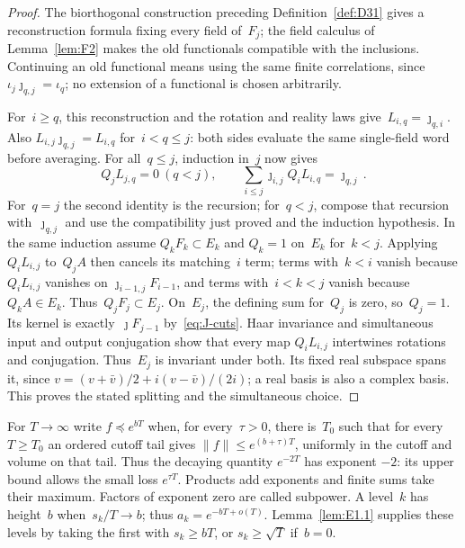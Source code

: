 \begin{proof}
The biorthogonal construction preceding Definition~\ref{def:D31} gives a reconstruction formula fixing every field of~$F_j$; the field calculus of Lemma~\ref{lem:F2} makes the old functionals compatible with the inclusions. Continuing an old functional means using the same finite correlations, since $\iota_j\jmath_{q,j}=\iota_q$; no extension of a functional is chosen arbitrarily.

For~$i\ge q$, this reconstruction and the rotation and reality laws give~$L_{i,q}=\jmath_{q,i}$. Also $L_{i,j}\jmath_{q,j}=L_{i,q}$ for~$i<q\le j$: both sides evaluate the same single-field word before averaging. For all~$q\le j$, induction in~$j$ now gives
\begin{equation}\label{eq:J-cuts}
Q_jL_{j,q}=0\ (q<j),\qquad
\sum_{i\le j}\jmath_{i,j}Q_iL_{i,q}=\jmath_{q,j}\,.
\end{equation}
For~$q=j$ the second identity is the recursion; for~$q<j$, compose that recursion with~$\jmath_{q,j}$ and use the compatibility just proved and the induction hypothesis. In the same induction assume $Q_kF_k\subset E_k$ and $Q_k=1$ on~$E_k$ for~$k<j$. Applying~$Q_iL_{i,j}$ to~$Q_jA$ then cancels its matching~$i$ term; terms with~$k<i$ vanish because $Q_iL_{i,j}$ vanishes on $\jmath_{i-1,j}F_{i-1}$, and terms with~$i<k<j$ vanish because~$Q_kA\in E_k$. Thus~$Q_jF_j\subset E_j$. On~$E_j$, the defining sum for~$Q_j$ is zero, so~$Q_j=1$. Its kernel is exactly~$\jmath F_{j-1}$ by~\eqref{eq:J-cuts}. Haar invariance and simultaneous input and output conjugation show that every map $Q_iL_{i,j}$ intertwines rotations and conjugation. Thus~$E_j$ is invariant under both. Its fixed real subspace spans it, since $v=(v+\bar v)/2+i(v-\bar v)/(2i)$; a real basis is also a complex basis. This proves the stated splitting and the simultaneous choice.
\end{proof}

For $T\to\infty$ write $f\preccurlyeq e^{bT}$ when, for every~$\tau>0$, there is~$T_0$ such that for every~$T\ge T_0$ an ordered cutoff tail gives $\|f\|\le e^{(b+\tau)T}$, uniformly in the cutoff and volume on that tail. Thus the decaying quantity $e^{-2T}$ has exponent $-2$: its upper bound allows the small loss $e^{\tau T}$. Products add exponents and finite sums take their maximum. Factors of exponent zero are called subpower. A level~$k$ has height~$b$ when~$s_k/T\to b$; thus $a_k=e^{-bT+o(T)}$. Lemma~\ref{lem:E1.1} supplies these levels by taking the first with $s_k\ge bT$, or $s_k\ge\sqrt T$ if~$b=0$.

